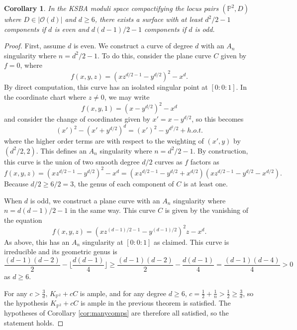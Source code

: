 \documentclass[10pt,a4paper]{amsart}
\newtheorem{corollary}{Corollary}
\newcommand{\bP}{\mathbb{P}}
\newcommand{\calO}{\mathcal{O}}
\begin{document}
\begin{corollary}
    In the KSBA moduli space compactifying the locus pairs $(\bP^2, D)$ where $D \in |\calO(d)|$ and $d \ge 6$, there exists a surface with at least $d^2/2 - 1$ components if $d$ is even and $d(d-1)/2  - 1$ components if $d$ is odd.  
\end{corollary}

\begin{proof}
    First, assume $d$ is even.  We construct a curve of degree $d$ with an $A_n$ singularity where $n = d^2/2 - 1$.  To do this, consider the plane curve $C$ given by $f = 0$, where
    \[ f(x,y,z) = (xz^{d/2-1} - y^{d/2})^2 - x^d. \]
    By direct computation, this curve has an isolated singular point at $[0:0: 1]$.  In the coordinate chart where $z \ne 0$, we may write 
    \[ f(x,y,1) = (x - y^{d/2})^2 - x^d\]
    and consider the change of coordinates given by $x' = x - y^{d/2}$, so this becomes 
    \[ (x')^2 - (x'+y^{d/2})^d = (x')^2 - y^{d^2/2} + h.o.t.\]
    where the higher order terms are with respect to the weighting of $(x', y)$ by $(d^2/2, 2)$.  This defines an $A_n$ singularity where $n = d^2/2 - 1$.  By construction, this curve is the union of two smooth degree $d/2$ curves as $f$ factors as 
    \[ f(x,y,z) = (xz^{d/2-1} - y^{d/2})^2 - x^d = (xz^{d/2-1} - y^{d/2} +x^{d/2})(xz^{d/2-1} - y^{d/2} -x^{d/2}).\]
    Because $d/2 \ge 6/2 = 3$, the genus of each component of $C$ is at least one. 

    When $d$ is odd, we construct a plane curve with an $A_n$ singularity where $n = d(d-1)/2  - 1$ in the same way.  This curve $C$ is given by the vanishing of the equation 
    \[ f(x,y,z) = (xz^{(d-1)/2-1} - y^{(d-1)/2})^2z - x^d. \]
    As above, this has an $A_n$ singularity at $[0:0:1]$ as claimed.  This curve is irreducible and its geometric genus is  
    \[ \frac{(d-1)(d-2)}{2} - \lfloor \frac{d(d-1)}{4}\rfloor \ge \frac{(d-1)(d-2)}{2} - \frac{d(d-1)}{4} = \frac{(d-1)(d-4)}{4} > 0  \]
    as $d \ge 6$.

    For any $c > \frac{3}{d} $, $K_{\bP^2} + cC$ is ample, and for any degree $d \ge 6$, $c = \frac{1}{2} + \frac{1}{n} > \frac{1}{2} \ge \frac{3}{d}$, so the hypothesis $K_{\bP^2} + cC$ is ample in the previous theorem is satisfied.  The hypotheses of Corollary \ref{cor:manycomps} are therefore all satisfied, so the statement holds. 
\end{proof}
\end{document}
